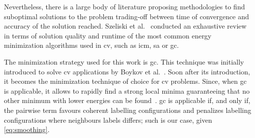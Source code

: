 Nevertheless, there is a large body of literature proposing methodologies to find suboptimal solutions to the problem trading-off between time of convergence and accuracy of the solution reached.
Szeliski et al.~\cite{szeliski2008comparative} conducted an exhaustive review in terms of solution quality and runtime of the most common energy minimization algorithms used in \ac{cv}, such as \ac{icm}, \ac{sa} or \ac{gc}.

The minimization strategy used for this work is \ac{gc}. 
This technique was initially introduced to solve \ac{cv} applications by Boykov et al.~\cite{boykov2001fast}.
Soon after its introduction, it becomes the minimization technique of choice for \ac{cv} problems.
Since, when \ac{gc} is applicable, it allows to rapidly find a strong local minima guaranteeing that no other minimum with lower energies can be found~\cite{delong2012fast}. 
\ac{gc} is applicable if, and only if, the pairwise term favours coherent labelling configurations and penalizes labelling configurations where neighbours labels differs; 
such is our case, given \cref{eq:smoothing}.


